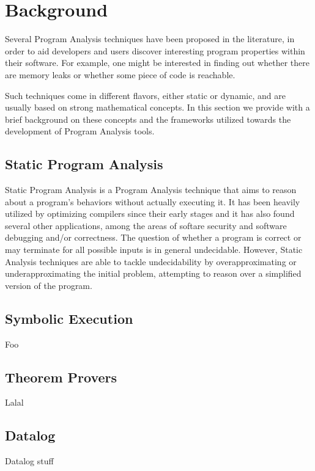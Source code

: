 
\chapter{Background}\label{c:background}

Several Program Analysis techniques have been proposed in the literature, in
order to aid developers and users discover interesting program properties within
their software. For example, one might be interested in finding out whether
there are memory leaks or whether some piece of code is reachable.

Such techniques come in different flavors, either static or dynamic, and are
usually based on strong mathematical concepts. In this section we provide with
a brief background on these concepts and the frameworks utilized towards 
the development of Program Analysis tools.

\section{Static Program Analysis}

Static Program Analysis is a Program Analysis technique that aims to reason
about a program's behaviors without actually executing it. It has been
heavily utilized by optimizing compilers since their early stages and it
has also found several other applications, among the areas of softare security
and software debugging and/or correctness\cite{spa}. The question of whether 
a program is correct or may terminate for all possible inputs is in general
undecidable. However, Static Analysis techniques are able to tackle
undecidability by overapproximating or underapproximating the initial problem,
attempting to reason over a simplified version of the program.



\section{Symbolic Execution}
Foo

\section{Theorem Provers}
Lalal

\section{Datalog}
Datalog stuff